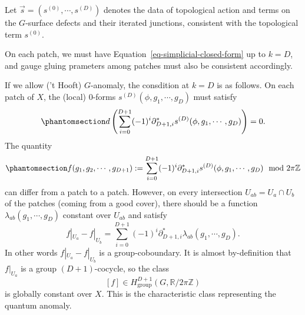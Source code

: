 \documentclass[
  letterpaper,
  DIV=11,
  numbers=noendperiod]{scrreport}
\begin{document}
\begin{tcolorbox}[enhanced jigsaw, opacityback=0, opacitybacktitle=0.6, leftrule=.75mm, arc=.35mm, coltitle=black, breakable, colframe=quarto-callout-important-color-frame, titlerule=0mm, colback=white, bottomrule=.15mm, left=2mm, colbacktitle=quarto-callout-important-color!10!white, toptitle=1mm, bottomtitle=1mm, title=\textcolor{quarto-callout-important-color}{\faExclamation}\hspace{0.5em}{\(G\)-anomaly from a Topological Term}, rightrule=.15mm, toprule=.15mm]

Let \(\vec{s} = (s^{(0)},\cdots,s^{(D)})\) denotes the data of
topological action and terms on the \(G\)-surface defects and their
iterated junctions, consistent with the topological term \(s^{(0)}\).

On each patch, we must have Equation~\ref{eq-simplicial-closed-form} up
to \(k=D\), and gauge gluing prameters among patches must also be
consistent accordingly.

If we allow ('t Hooft) \(G\)-anomaly, the consdition at \(k=D\) is as
follows. On each patch of \(X\), the (local) 0-forms
\(s^{(D)}(\phi,g_1,\cdots,g_D)\) must satisfy
\begin{equation}\phantomsection\label{eq-sD-consistensy}{
d\left(\sum_{i=0}^{D+1} (-1)^{i} \partial_{D+1,i}^* s^{(D)}(\phi,g_1,\cdots,g_D)\right) = 0.
}\end{equation} The quantity
\begin{equation}\phantomsection\label{eq-anomaly-differential}{
f(g_1,g_2,\cdots,g_{D+1}) := \sum_{i=0}^{D+1} (-1)^{i} \partial_{D+1,i}^* s^{(D)}(\phi,g_1,\cdots,g_D) \mod 2\pi\mathbb{Z}
}\end{equation} can differ from a patch to a patch. However, on every
intersection \(U_{ab} = U_a\cap U_b\) of the patches (coming from a good
cover), there should be a function \(\lambda_{ab}(g_1,\cdots,g_D)\)
constant over \(U_{ab}\) and satisfy \[
f|_{U_a} - f|_{U_b} = \sum_{i=0}^{D+1} (-1)^{i} \partial_{D+1,i}^* \lambda_{ab}(g_1,\cdots,g_D).
\] In other words \(f|_{U_a} - f|_{U_b}\) is a group-coboundary. It is
almost by-definition that \(f|_{U_a}\) is a group \((D+1)\)-cocycle, so
the class \[
[f] \in H^{D+1}_\text{group}(G,\mathbb{R}/2\pi\mathbb{Z})
\] is globally constant over \(X\). This is the characteristic class
representing the quantum anomaly.

\end{tcolorbox}
\end{document}
